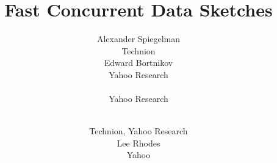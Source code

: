 \documentclass{sig-alternate}
\begin{document}
\title{Fast Concurrent Data Sketches} 

\author{
 \alignauthor Alexander Spiegelman\\
   \affaddr Technion\\
 \alignauthor Edward Bortnikov\\
    \affaddr Yahoo Research\\
 \\
   \affaddr Yahoo Research\\
\and
 \\
   \affaddr Technion, Yahoo Research\\
\alignauthor Lee Rhodes\\
    \affaddr Yahoo \\ 
}

\date{}


\maketitle







%

            




%





\end{document}
